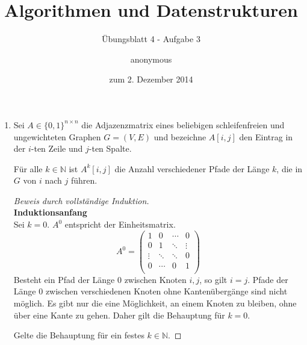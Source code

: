 \documentclass[a4paper]{scrartcl}
\title{Algorithmen und Datenstrukturen}
\subtitle{Übungsblatt 4 - Aufgabe 3}
\author{
    anonymous
}
\date{zum 2. Dezember 2014}
\begin{document}
\maketitle

\begin{enumerate}
    \item
        Sei $A \in \{0,1\}^{n \times n}$ die Adjazenzmatrix eines beliebigen
        schleifenfreien und ungewichteten Graphen $G = (V, E)$ und bezeichne
        $A[i,j]$ den Eintrag in der $i$-ten Zeile und $j$-ten Spalte.
        \begin{behaupt}
            Für alle $k \in \mathbb{N}$ ist $A^k[i,j]$ die Anzahl verschiedener
            Pfade der Länge $k$, die in $G$ von $i$ nach $j$ führen.
        \end{behaupt}
        \begin{proof}[Beweis durch vollständige Induktion] \hfill \\
            \textbf{Induktionsanfang} \\
            Sei $k = 0$.
            $A^0$ entspricht der Einheitsmatrix.
            \begin{equation}
                A^0 =
                \begin{pmatrix}
                    1 & 0 & \cdots & 0 \\
                    0 & 1 & \ddots & \vdots \\
                    \vdots & \ddots & \ddots & 0 \\
                    0 & \cdots & 0 & 1 \\
                \end{pmatrix}
            \end{equation}
            Besteht ein Pfad der Länge $0$ zwischen Knoten $i, j$, so gilt
            $i = j$.
            Pfade der Länge $0$ zwischen verschiedenen Knoten ohne
            Kantenübergänge sind nicht möglich.
            Es gibt nur die eine Möglichkeit, an einem Knoten zu bleiben, ohne
            über eine Kante zu gehen.
            Daher gilt die Behauptung für $k = 0$.
            
            Gelte die Behauptung für ein festes $k \in \mathbb{N}$.


\end{proof}
\end{enumerate}
\end{document}
